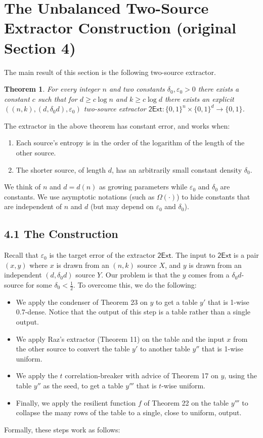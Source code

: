 \documentclass[10pt,a4paper]{article}
\newtheorem{theorem}{Theorem}
\newcommand{\twoExt}{\mathsf{2Ext}}
\begin{document}
\section*{The Unbalanced Two-Source Extractor Construction (original Section 4)}
The main result of this section is the following two-source extractor.
\begin{theorem}
For every integer $n$ and two constants $\delta_0,\varepsilon_0>0$ there exists a constant $c$ such that for $d\ge c\log n$ and $k\ge c\log d$ there exists an explicit $((n,k),(d,\delta_0d),\varepsilon_0)$ two-source extractor $\twoExt:\{0,1\}^n\times\{0,1\}^d\to\{0,1\}$.
\end{theorem}
The extractor in the above theorem has constant error, and works when:
\begin{enumerate}
\item Each source's entropy is in the order of the logarithm of the length of the other source.
\item The shorter source, of length $d$, has an arbitrarily small constant density $\delta_0$.
\end{enumerate}
We think of $n$ and $d=d(n)$ as growing parameters while $\varepsilon_0$ and $\delta_0$ are constants. We use asymptotic notations (such as $\Omega(\cdot)$) to hide constants that are independent of $n$ and $d$ (but may depend on $\varepsilon_0$ and $\delta_0$).
\subsection*{4.1 The Construction}
Recall that $\varepsilon_0$ is the target error of the extractor $\twoExt$. The input to $\twoExt$ is a pair $(x,y)$ where $x$ is drawn from an $(n,k)$ source $X$, and $y$ is drawn from an independent $(d,\delta_0d)$ source $Y$. Our problem is that the $y$ comes from a $\delta_0d$-source for some $\delta_0<\frac12$. To overcome this, we do the following:
\begin{itemize}
\item We apply the condenser of Theorem 23 on $y$ to get a table $y'$ that is 1-wise 0.7-dense. Notice that the output of this step is a table rather than a single output.
\item We apply Raz's extractor (Theorem 11) on the table and the input $x$ from the other source to convert the table $y'$ to another table $y''$ that is 1-wise uniform.
\item We apply the $t$ correlation-breaker with advice of Theorem 17 on $y$, using the table $y''$ as the seed, to get a table $y'''$ that is $t$-wise uniform.
\item Finally, we apply the resilient function $f$ of Theorem 22 on the table $y'''$ to collapse the many rows of the table to a single, close to uniform, output.
\end{itemize}
Formally, these steps work as follows:
\end{document}
